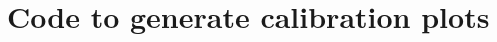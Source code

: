 \chapter{Code to generate calibration plots}
\label{ch:kbbq_plot_code}
\inputminted{r}{scripts/plot_benchmarks.R}
